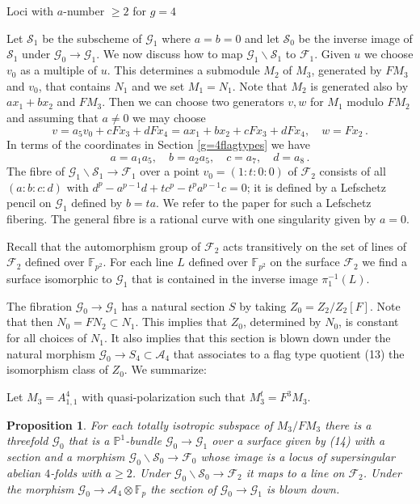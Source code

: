 \documentclass[11pt]{amsart}
\numberwithin{equation}{section}
\newcommand{\FF}{\mathbb F}
\newcommand{\PP}{\mathbb P}
\newtheorem{proposition}[theorem]{Proposition}
\theoremstyle{definition}
\theoremstyle{remark}
\begin{document}
\begin{section}{Loci with $a$-number $\geq 2$ for $g=4$}
\bigskip

Let $\mathcal{S}_1$ be the subscheme of $\mathcal{G}_1$ where $a=b=0$ and let
$\mathcal{S}_0$ be the inverse image of $\mathcal{S}_1$ under $\mathcal{G}_0\to \mathcal{G}_1$.
We now discuss how to map $\mathcal{G}_1\backslash \mathcal{S}_1$ to $\mathcal{F}_1$. Given $u$
we choose $v_0$ as a multiple of $u$. This determines a submodule $M_2$
of $M_3$,  generated by $FM_3$ and $v_0$, 
that contains $N_1$ and we set $M_1=N_1$. Note that $M_2$ is generated
also by $ax_1+bx_2$ and $FM_3$. 
Then we can choose two generators $v,w$ for $M_1$ modulo $FM_2$
and assuming that $a\neq 0$ we may choose
$$
v=a_5v_0+cFx_3+dFx_4=ax_1+bx_2+cFx_3+dFx_4 , \quad w=Fx_2\, .
$$
In terms of the coordinates in Section \ref{g=4flagtypes} we have
$$
a=a_1a_5,\quad b=a_2a_5, \quad c=a_7, \quad d=a_8\, .
$$
The fibre of $\mathcal{G}_1 \backslash \mathcal{S}_1\to \mathcal{F}_1$ 
over a point $v_0=(1:t:0:0)$ of $\mathcal{F}_2$ consists of all
$(a:b:c:d)$ with $d^p-a^{p-1}d+tc^p-t^pa^{p-1}c=0$; 
it is defined by a 
Lefschetz pencil on $\mathcal{G}_1$ defined by $b=ta$. We refer
to the paper \cite{K2017} for such a Lefschetz fibering.
The general fibre is a rational
curve with one singularity given by $a=0$.

Recall that the automorphism group 
of $\mathcal{F}_2$ 
acts transitively on the set of lines of $\mathcal{F}_2$ defined
over ${\FF}_{p^2}$.
For each line $L$ defined over ${\FF}_{p^2}$ 
on the surface $\mathcal{F}_2$ we find a surface
isomorphic to $\mathcal{G}_1$ 
that is contained in the inverse image $\pi_1^{-1}(L)$. 

The fibration $\mathcal{G}_0 \to \mathcal{G}_1$ has a 
natural section $S$ by taking $Z_0=Z_2/Z_2[F]$. 
Note that then $N_0=FN_2 \subset N_1$. 
This implies that $Z_0$, determined by
$N_0$, is constant for all choices of $N_1$. It also implies that this 
section is blown down under the natural morphism $\mathcal{G}_0 \to S_4 \subset 
\mathcal{A}_4$ that associates to a flag type quotient (13) the isomorphism
class of $Z_0$. We summarize: 

Let $M_3=A_{1,1}^4$ with quasi-polarization such that $M_3^t=F^3M_3$. 
 
\begin{proposition} For each totally isotropic subspace of $M_3/FM_3$ 
there is a threefold $\mathcal{G}_0$ that is a ${\PP}^1$-bundle 
$\mathcal{G}_0 \to \mathcal{G}_1$ over a surface given by (14) with a section 
and a morphism $\mathcal{G}_0\backslash \mathcal{S}_0 \to \mathcal{F}_0$ whose image is a locus of supersingular
abelian $4$-folds with $a\geq 2$. Under $\mathcal{G}_0 \backslash \mathcal{S}_0 \to 
\mathcal{F}_2$ it maps to a line on $\mathcal{F}_2$.
Under the morphism $\mathcal{G}_0 \to \mathcal{A}_4\otimes {\FF}_p$
the section of $\mathcal{G}_0 \to \mathcal{G}_1$ is blown down.
\end{proposition}

\end{section}
\end{document}

